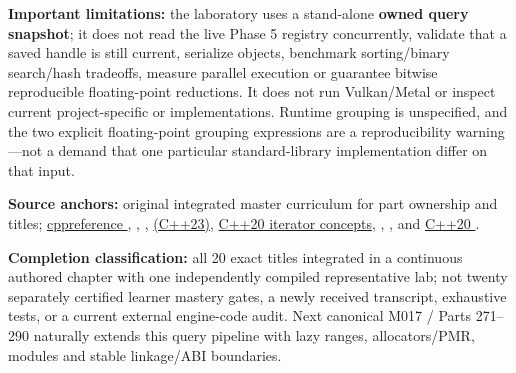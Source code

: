 \textbf{Important limitations:} the laboratory uses a stand-alone \textbf{owned query snapshot}; it does not read the live Phase 5 registry concurrently, validate that a saved handle is still current, serialize  objects, benchmark sorting/binary search/hash tradeoffs, measure parallel execution or guarantee bitwise reproducible floating-point reductions. It does not run Vulkan/Metal or inspect current project-specific  or  implementations. Runtime  grouping is unspecified, and the two explicit floating-point grouping expressions are a reproducibility warning---not a demand that one particular standard-library implementation differ on that input.

\textbf{Source anchors:} original integrated master curriculum for part ownership and titles; \href{https://en.cppreference.com/w/cpp/utility/optional}{cppreference }, \href{https://en.cppreference.com/w/cpp/utility/variant}{}, \href{https://en.cppreference.com/w/cpp/utility/any}{}, \href{https://en.cppreference.com/w/cpp/utility/expected}{ (C++23)}, \href{https://en.cppreference.com/w/cpp/iterator}{C++20 iterator concepts}, \href{https://en.cppreference.com/w/cpp/algorithm/lower_bound}{}, \href{https://en.cppreference.com/cpp/algorithm/reduce}{}, and \href{https://en.cppreference.com/cpp/container/unordered_map/erase_if}{C++20 }.

\textbf{Completion classification:} all 20 exact titles integrated in a continuous authored chapter with one independently compiled representative lab; not twenty separately certified learner mastery gates, a newly received transcript, exhaustive tests, or a current external engine-code audit. Next canonical M017 / Parts 271--290 naturally extends this query pipeline with lazy ranges, allocators/PMR, modules and stable linkage/ABI boundaries.

